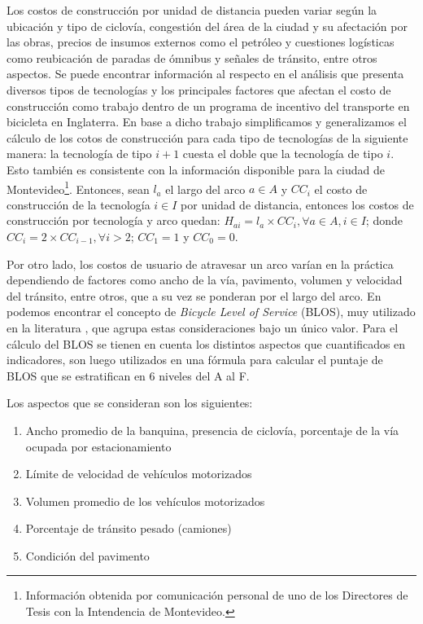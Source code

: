 Los costos de construcción por unidad de distancia pueden variar según la ubicación y tipo de ciclovía, congestión del área de la ciudad y su afectación por las obras, precios de insumos externos como el petróleo y cuestiones logísticas como reubicación de paradas de ómnibus y señales de tránsito, entre otros aspectos. Se puede encontrar información al respecto en el análisis \textcite{typicalcostsofcylcing} que presenta diversos tipos de tecnologías y los principales factores que afectan el costo de construcción como trabajo dentro de un programa de incentivo del transporte en bicicleta en Inglaterra. En base a dicho trabajo simplificamos y generalizamos el cálculo de los cotos de construcción para cada tipo de tecnologías de la siguiente manera: la tecnología de tipo $i + 1$ cuesta el doble que la tecnología de tipo $i$. Esto también es consistente con la información disponible para la ciudad de Montevideo\footnote{Información obtenida por comunicación personal de uno de los Directores de Tesis con la Intendencia de Montevideo.}. Entonces, sean $l_a$ el largo del arco $a \in A$ y $CC_i$ el costo de construcción de la tecnología $i \in I$ por unidad de distancia, entonces los costos de construcción por tecnología y arco quedan: $H_{ai} = l_a \times CC_i, \forall a \in A, i \in I$; donde $CC_i = 2 \times CC_{i-1}, \forall i > 2$; $CC_1 = 1$ y $CC_0 = 0$.

Por otro lado, los costos de usuario de atravesar un arco varían en la práctica dependiendo de factores como ancho de la vía, pavimento, volumen y velocidad del tránsito, entre otros, que a su vez se ponderan por el largo del arco. En \textcite{blos2007} podemos encontrar el concepto de {\it Bicycle Level of Service} (BLOS), muy utilizado en la literatura \parencite{Zhu2019, Liu2019}, que agrupa estas consideraciones bajo un único valor. Para el cálculo del BLOS se tienen en cuenta los distintos aspectos que cuantificados en indicadores, son luego utilizados en una fórmula para calcular el puntaje de BLOS que se estratifican en 6 niveles del A al F.

Los aspectos que se consideran son los siguientes:

\begin{enumerate}
  \item{Ancho promedio de la banquina, presencia de ciclovía, porcentaje de la vía ocupada por estacionamiento}
  \item{Límite de velocidad de vehículos motorizados}
  \item{Volumen promedio de los vehículos motorizados}
  \item{Porcentaje de tránsito pesado (camiones)}
  \item{Condición del pavimento}
\end{enumerate}

